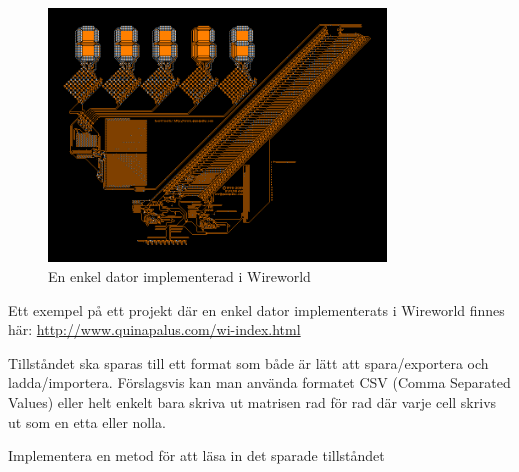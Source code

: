         \begin{figure}[h]
            \begin{center}
                \includegraphics[width=0.8\textwidth]{../img/w12-lab/wireworld_computer.png}
            \end{center}
            \caption{En enkel dator implementerad i Wireworld}
        \end{figure}

        Ett exempel på ett projekt där en enkel dator implementerats i Wireworld finnes här: \url{http://www.quinapalus.com/wi-index.html}



        Tillståndet ska sparas till ett format som både är lätt att spara/exportera och ladda/importera.
        Förslagsvis kan man använda formatet CSV (Comma Separated Values) eller helt enkelt bara skriva
        ut matrisen rad för rad där varje cell skrivs ut som en etta eller nolla.

        Implementera en metod för att läsa in det sparade tillståndet







